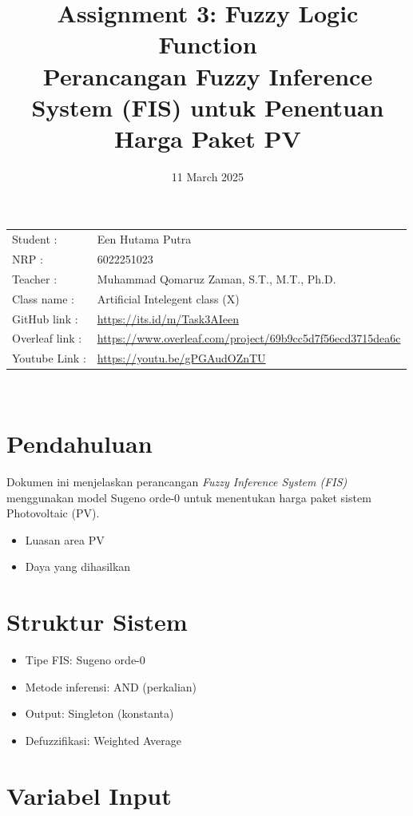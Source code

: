 \documentclass{article}
\title{Assignment 3: Fuzzy Logic Function\\ Perancangan Fuzzy Inference System (FIS) untuk Penentuan Harga Paket PV
}
\date{11 March 2025}
\begin{document}
\maketitle


\noindent\begin{tabular}{@{}ll}
     Student        : & Een Hutama Putra\\
     NRP            : & 6022251023\\
     Teacher        : &  Muhammad Qomaruz Zaman, S.T., M.T., Ph.D.\\
     Class name     : & Artificial Intelegent class (X)\\
     GitHub link    : & \url{https://its.id/m/Task3AIeen}\\
     Overleaf link  : & \url{https://www.overleaf.com/project/69b9cc5d7f56ecd3715dea6c}\\
     Youtube Link    : & \url{https://youtu.be/gPGAudOZnTU}
\end{tabular}\\
    
\vspace{0,5cm}


\section{Pendahuluan}
Dokumen ini menjelaskan perancangan \textit{Fuzzy Inference System (FIS)} menggunakan model Sugeno orde-0 untuk menentukan harga paket sistem Photovoltaic (PV).
\begin{itemize}
    \item Luasan area PV
    \item Daya yang dihasilkan
\end{itemize}

\section{Struktur Sistem}
\begin{itemize}
    \item Tipe FIS: Sugeno orde-0
    \item Metode inferensi: AND (perkalian)
    \item Output: Singleton (konstanta)
    \item Defuzzifikasi: Weighted Average
\end{itemize}

\section{Variabel Input}
\end{document}
